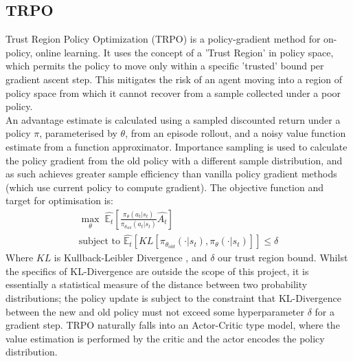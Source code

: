 \documentclass{article}
\begin{document}
\subsection{TRPO}
Trust Region Policy Optimization (TRPO) \citep{pmlr-v37-schulman15} is a policy-gradient method for on-policy, online learning. It uses the concept of a 'Trust Region' in policy space, which permits the policy to move only within a specific 'trusted' bound per gradient ascent step. This mitigates the risk of an agent moving into a region of policy space from which it cannot recover from a sample collected under a poor policy. \\\newline
An advantage estimate is calculated using a sampled discounted return under a policy $\pi$, parameterised by $\theta$, from an episode rollout, and a noisy value function estimate from a function approximator. Importance sampling is used to calculate the policy gradient from the old policy with a different sample distribution, and as such achieves greater sample efficiency than vanilla policy gradient methods (which use current policy to compute gradient). The objective function and target for optimisation is:
\begin{gather}
    \max_\theta\; \hat{\mathbb{E}_t}\left[\frac{\pi_\theta(a_t | s_t)}{\pi_{\theta_{old}}(a_t | s_t)}\hat{A_t}\right]\\
\text{subject to } \hat{\mathbb{E}_t}\left[KL\left[\pi_{\theta_{old}}(\cdot | s_t),\pi_\theta(\cdot|s_t)\right]\right] \leq \delta
\end{gather}
Where $KL$ is Kullback-Leibler Divergence \citep{Joyce2011}, and $\delta$ our trust region bound. Whilst the specifics of KL-Divergence are outside the scope of this project, it is essentially a statistical measure of the distance between two probability distributions; the policy update is subject to the constraint that KL-Divergence between the new and old policy must not exceed some hyperparameter $\delta$ for a gradient step. TRPO naturally falls into an Actor-Critic type model, where the value estimation is performed by the critic and the actor encodes the policy distribution. 
\end{document}
